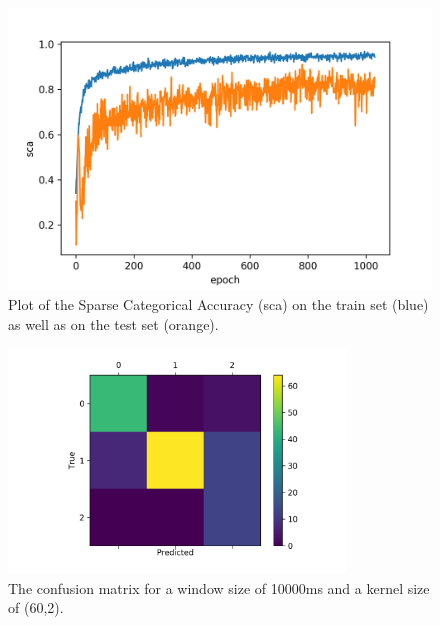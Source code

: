 \documentclass[runningheads]{llncs}
\begin{document}
\begin{figure}
\vspace{-5mm}
\centering
\includegraphics[width=\textwidth]{accuracy_plot.png}
\caption{Plot of the Sparse Categorical Accuracy (sca) on the train set (blue) as well as on the test set (orange).}
\label{fig4}	
\end{figure} 

\begin{figure}
\centering 
\includegraphics[width=0.8\textwidth]{confusionmatrix.png}
\caption{The confusion matrix for a window size of 10000ms and a kernel size of (60,2).}
\label{fig3}	
\end{figure}
\end{document}
